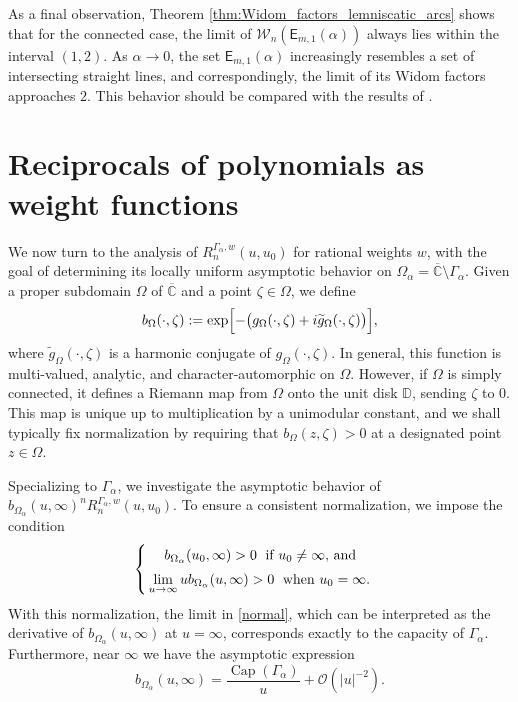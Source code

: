 \documentclass[12pt,oneside,reqno]{amsart}
\theoremstyle{definition}
\numberwithin{equation}{section}
\newcommand{\C}{{\mathbb C}}
\newcommand{\D}{{\mathbb D}}
\newcommand{\E}{{\mathsf E}}
\newcommand{\cW}{{\mathcal{W}}}
\renewcommand{\Cap}{\operatorname{Cap}}
\begin{document}
As a final observation, Theorem \ref{thm:Widom_factors_lemniscatic_arcs} shows that for the connected case, the limit of $\cW_n(\E_{m,1}(\alpha))$ always lies within the interval $(1,2)$. As $\alpha\rightarrow 0$, the set $\E_{m,1}(\alpha)$ increasingly resembles a set of intersecting straight lines, and correspondingly, the limit of its Widom factors approaches $2$. This behavior should be compared with the results of \cite[Theorem 1.2]{christiansen-eichinger-rubin23}.


\section{Reciprocals of polynomials as weight functions}
\label{sec:reciprocal_weight}

We now turn to the analysis of \( R_{n}^{\Gamma_\alpha,w}(u,u_0) \) for rational weights \( w \), with the goal of determining its locally uniform asymptotic behavior on \( \Omega_\alpha = \overline{\mathbb{C}} \setminus \Gamma_\alpha \).
Given a proper subdomain $\Omega$ of $\overline{\C}$ and a point $\zeta\in\Omega$, we define
\begin{equation}
   b_{\Omega}(\cdot, \zeta) := \exp\Bigl[-\bigl(g_{\Omega}(\cdot, \zeta) 
   + i \widetilde{g}_{\Omega}(\cdot, \zeta)\bigr)\Bigr],
\end{equation}
where \( \widetilde{g}_{\Omega}(\cdot, \zeta) \) is a harmonic conjugate of \( g_{\Omega}(\cdot, \zeta) \). In general, this function is multi-valued, analytic, and character-automorphic on $\Omega$. However, if $\Omega$ is simply connected, it defines a Riemann map from $\Omega$ onto the unit disk $\D$, sending $\zeta$ to $0$. This map is unique up to multiplication by a unimodular constant, and we shall typically fix normalization by requiring that $b_\Omega(z, \zeta)>0$ at a designated point $z\in\Omega$. 

Specializing to $\Gamma_\alpha$, we investigate the asymptotic behavior of
$b_{\Omega_\alpha}(u, \infty)^n R_{n}^{\Gamma_\alpha, w}(u, u_0)$. To ensure a consistent normalization, we impose the condition 
\begin{equation}
\label{normal}
\begin{cases}
\displaystyle{
   \; \quad b_{\Omega_\alpha}(u_0, \infty) > 0} \; \mbox{ if $u_0\neq \infty$, and } \smallskip \\ 
\displaystyle{
   \, \lim_{u\to\infty} ub_{\Omega_\alpha}(u, \infty)>0 \; \mbox{ when } u_0=\infty}.
\end{cases}
\end{equation}
With this normalization, the limit in \eqref{normal}, which can be interpreted as the derivative of $b_{\Omega_\alpha}(u, \infty)$ at $u=\infty$, corresponds exactly to the capacity of $\Gamma_\alpha$. Furthermore, near $\infty$ we have the asymptotic expression
\begin{equation}
\label{near inf}
b_{\Omega_\alpha}(u, \infty)=\frac{\Cap(\Gamma_\alpha)}{u}+\mathcal{O}(\vert u\vert^{-2}).
\end{equation}
\end{document}
